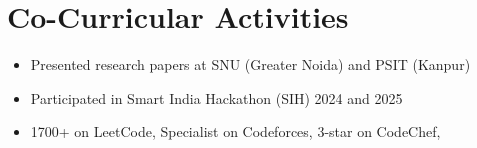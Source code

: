 \documentclass[a4paper,10pt]{article}
\begin{document}
\section*{Co-Curricular Activities}
\begin{itemize}[leftmargin=0.4cm, itemsep=0pt, topsep=2pt]
    \item Presented research papers at SNU (Greater Noida) and PSIT (Kanpur)
    \item Participated in Smart India Hackathon (SIH) 2024 and 2025
    \item 1700+ on LeetCode, Specialist on Codeforces, 3-star on CodeChef,
\end{itemize}
\end{document}
